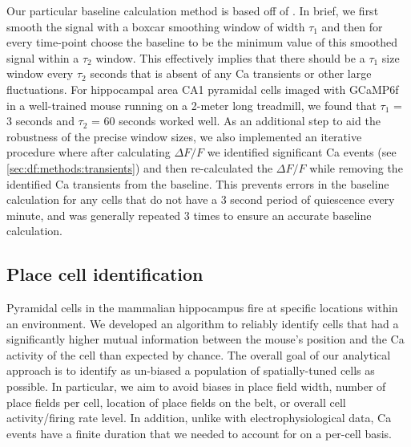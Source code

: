 Our particular baseline calculation method is based off of \citet{Jia2011}.
In brief, we first smooth the signal with a boxcar smoothing window of width $\tau_1$ and then for every time-point choose the baseline to be the minimum value of this smoothed signal within a $\tau_2$ window.
This effectively implies that there should be a $\tau_1$ size window every $\tau_2$ seconds that is absent of any Ca transients or other large fluctuations.
For hippocampal area CA1 pyramidal cells imaged with GCaMP6f in a well-trained mouse running on a 2-meter long treadmill, we found that $\tau_1$ = 3 seconds and $\tau_2$ = 60 seconds worked well.
As an additional step to aid the robustness of the precise window sizes, we also implemented an iterative procedure where after calculating $\Delta F/F$ we identified significant Ca events (see \autoref{sec:df:methods:transients}) and then re-calculated the $\Delta F/F$ while removing the identified Ca transients from the baseline.
This prevents errors in the baseline calculation for any cells that do not have a 3 second period of quiescence every minute, and was generally repeated 3 times to ensure an accurate baseline calculation.

\subsection{Place cell identification}
\label{sec:intro:techniques:pc_id}
Pyramidal cells in the mammalian hippocampus fire at specific locations within an environment.
We developed an algorithm to reliably identify cells that had a significantly higher mutual information between the mouse's position and the Ca activity of the cell than expected by chance.
The overall goal of our analytical approach is to identify as un-biased a population of spatially-tuned cells as possible.
In particular, we aim to avoid biases in place field width, number of place fields per cell, location of place fields on the belt, or overall cell activity/firing rate level.
In addition, unlike with electrophysiological data, Ca events have a finite duration that we needed to account for on a per-cell basis.  

